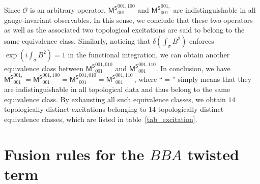 \documentclass[11pt,nofootinbib,preprint]{revtex4-1}
\begin{document}
Since $\mathcal{O}$ is an arbitrary operator, $\mathsf{M^S}_{001}^{001,100}$ and $\mathsf{M^S}_{001}^{001,}$ are indistinguishable in all gauge-invariant observables. In this sense, we conclude that these two operators as well as the associated two topological excitations  are said to  belong to the same equivalence class. Similarly, noticing that $\delta \left( \int_{\sigma}{{B}^2} \right) $ enforces $\exp \left( i\int_{\sigma}{{B}^2} \right)=1$ in the functional integration,   we can obtain another equivalence class between  $\mathsf{M^S}_{001}^{001,010}$ and $\mathsf{M^S}_{001}^{001,110}$. In conclusion, we have
$	\mathsf{M^S}_{001}^{001,}=\mathsf{M^S}_{001}^{001,100}=\mathsf{M^S}_{001}^{001,010}=\mathsf{M^S}_{001}^{001,110}\,$,
where ``$=$'' simply means that they are indistinguishable in all topological data and thus belong to the same equivalence class. 
By exhausting all such equivalence classes,  we obtain $14$ topologically distinct excitations belonging to $14$ topologically distinct equivalence classes, which  are listed in table~\ref{tab_excitation}.


\section{Fusion rules for the $BBA$ twisted term\label{s3}}
\end{document}
